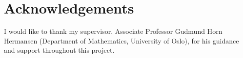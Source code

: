 \section*{Acknowledgements}
I would like to thank my supervisor, Associate Professor Gudmund Horn Hermansen (Department of Mathematics, University of Oslo), for his guidance and support throughout this project.
